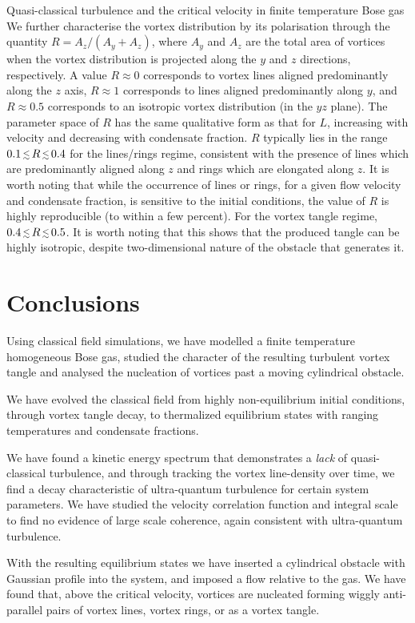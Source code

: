 \begin{chapter}{\label{cha:nonequib}Quasi-classical turbulence and the critical velocity in finite temperature Bose gas}
We further characterise the vortex distribution by its polarisation through the quantity $R=A_z/(A_y+A_z)$, where $A_y$ and $A_z$ are the total area of vortices when the vortex distribution is projected along the $y$ and $z$ directions, respectively.  A value $R \approx 0$ corresponds to vortex lines aligned predominantly along the $z$ axis, $R\approx 1$ corresponds to lines aligned predominantly along $y$, and $R\approx 0.5$ corresponds to an isotropic vortex distribution (in the $yz$ plane).  The parameter space of $R$ has the same qualitative form as that for $L$, increasing with velocity and decreasing with condensate fraction. $R$ typically lies in the range $0.1 \,\mbox{\footnotesize$\lesssim$}\, R\,\mbox{\footnotesize$\lesssim$}\, 0.4$ for the lines/rings regime, consistent with the presence of lines which are predominantly aligned along $z$ and rings which are elongated along $z$.  It is worth noting that while the occurrence of lines or rings, for a given flow velocity and condensate fraction, is sensitive to the initial conditions, the value of $R$ is highly reproducible (to within a few percent).       For the vortex tangle regime, $0.4 \,\mbox{\footnotesize$\lesssim$}\, R\,\mbox{\footnotesize$\lesssim$}\, 0.5$.  It is worth noting that this shows that the produced tangle can be highly isotropic, despite two-dimensional nature of the obstacle that generates it.

\section{Conclusions\label{sec:conclusions}}

Using classical field simulations, we have modelled a finite temperature homogeneous Bose gas, 
studied the character of the resulting turbulent vortex tangle and analysed the nucleation
of vortices past a moving cylindrical obstacle.

We have evolved the classical field
from highly non-equilibrium initial conditions, through vortex tangle decay, to thermalized equilibrium
states with ranging temperatures and condensate fractions.

We have found a kinetic energy spectrum that demonstrates a {\it lack} of quasi-classical turbulence, and through tracking the vortex line-density over time, we find a decay characteristic of ultra-quantum turbulence for certain system parameters. We have studied the velocity correlation function and integral scale to find no evidence of large scale coherence, again consistent with ultra-quantum turbulence.

With the resulting equilibrium states we have inserted a cylindrical obstacle with Gaussian profile into the system, and imposed a flow relative to the gas.  We have found that, above the critical velocity, vortices are nucleated forming wiggly anti-parallel pairs of vortex lines, vortex rings, or as a vortex tangle.


\end{chapter}
